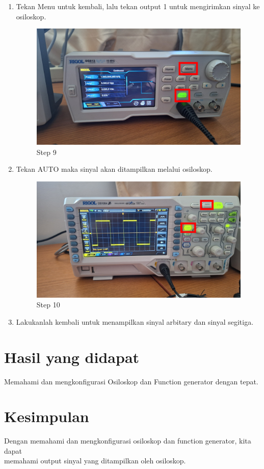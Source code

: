\begin{center}
\begin{enumerate}
		\item Tekan Menu untuk kembali, lalu tekan output 1 untuk mengirimkan sinyal ke osiloskop.
		      \begin{figure}[H]
			      \centering
			      \includegraphics[width=0.7\linewidth]{P1/img/per 2/step 9.png}
			      \caption{Step 9}
			      \label{fig:Step 9(Group 14)}
		      \end{figure}

		\item Tekan AUTO maka sinyal akan ditampilkan melalui osiloskop.
		      \begin{figure}[H]
			      \centering
			      \includegraphics[width=0.7\linewidth]{P1/img/per 2/step 10.png}
			      \caption{Step 10}
			      \label{fig:Step 10(Group 15)}
		      \end{figure}

		\item Lakukanlah kembali untuk menampilkan sinyal arbitary dan sinyal segitiga.
	\end{enumerate}

\end{center}


\section{Hasil yang didapat}
Memahami dan mengkonfigurasi Osiloskop dan Function generator dengan tepat.

\section{Kesimpulan}
Dengan memahami dan mengkonfigurasi osiloskop dan function generator, kita dapat
\\memahami output sinyal yang ditampilkan oleh osiloskop.
